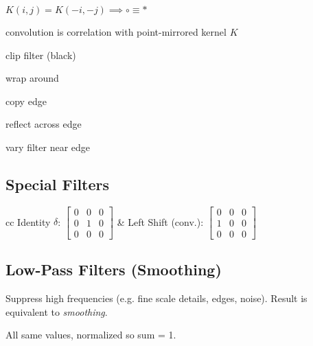 \begin{theorems}
  \begin{itemize*}
    \item \(K(i, j) = K(-i, -j) \implies \circ \equiv \ast\) \\
    \item convolution is correlation with point-mirrored kernel \(K\)
  \end{itemize*}
\end{theorems}

\begin{definition}
  \begin{itemize*}
    \item clip filter (black)
    \item wrap around
    \item copy edge
    \item reflect across edge
    \item vary filter near edge
  \end{itemize*}
\end{definition}


\subsection{Special Filters}

\begin{tabularx}{\linewidth}{cc}
  Identity \(\delta\): \(\begin{bmatrix}
    0 & 0 & 0 \\
    0 & 1 & 0 \\
    0 & 0 & 0
  \end{bmatrix}\) & 
  Left Shift (conv.): \(\begin{bmatrix}
    0 & 0 & 0 \\
    1 & 0 & 0 \\
    0 & 0 & 0
  \end{bmatrix}\)
\end{tabularx}

\subsection{Low-Pass Filters (Smoothing)}
Suppress high frequencies (e.g. fine scale details, edges, noise).
Result is equivalent to \textit{smoothing}.

\begin{definition}
  All same values, normalized so sum = 1.
\end{definition}

